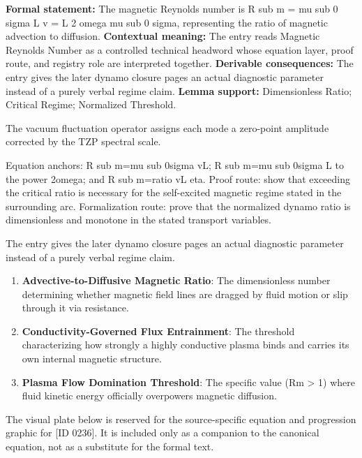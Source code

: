\begingroup\footnotesize\setlength{\emergencystretch}{3em}\sloppy
\textbf{Formal statement:} The magnetic Reynolds number is R sub m = mu sub 0 sigma L v = L 2 omega mu sub 0 sigma, representing the ratio of magnetic advection to diffusion. \textbf{Contextual meaning:} The entry reads Magnetic Reynolds Number as a controlled technical headword whose equation layer, proof route, and registry role are interpreted together. \textbf{Derivable consequences:} The entry gives the later dynamo closure pages an actual diagnostic parameter instead of a purely verbal regime claim. \textbf{Lemma support:} Dimensionless Ratio; Critical Regime; Normalized Threshold.\par
\endgroup

The vacuum fluctuation operator assigns each mode a zero-point amplitude corrected by the TZP spectral scale.

Equation anchors: R sub m=mu sub 0sigma vL; R sub m=mu sub 0sigma L to the power 2omega; and R sub m=ratio vL eta. Proof route: show that exceeding the critical ratio is necessary for the self-excited magnetic regime stated in the surrounding arc. Formalization route: prove that the normalized dynamo ratio is dimensionless and monotone in the stated transport variables.

The entry gives the later dynamo closure pages an actual diagnostic parameter instead of a purely verbal regime claim.
\endgroup

\begin{enumerate}[leftmargin=1.6em,itemsep=6pt,topsep=4pt]
\item \textbf{Advective-to-Diffusive Magnetic Ratio}: The dimensionless number determining whether magnetic field lines are dragged by fluid motion or slip through it via resistance.
\item \textbf{Conductivity-Governed Flux Entrainment}: The threshold characterizing how strongly a highly conductive plasma binds and carries its own internal magnetic structure.
\item \textbf{Plasma Flow Domination Threshold}: The specific value (Rm > 1) where fluid kinetic energy officially overpowers magnetic diffusion.
\end{enumerate}

\begingroup\footnotesize\sloppy
The visual plate below is reserved for the source-specific equation and progression graphic for [ID 0236]. It is included only as a companion to the canonical equation, not as a substitute for the formal text.
\par\endgroup
\ifTZPDarkEdition
{}
\fi

